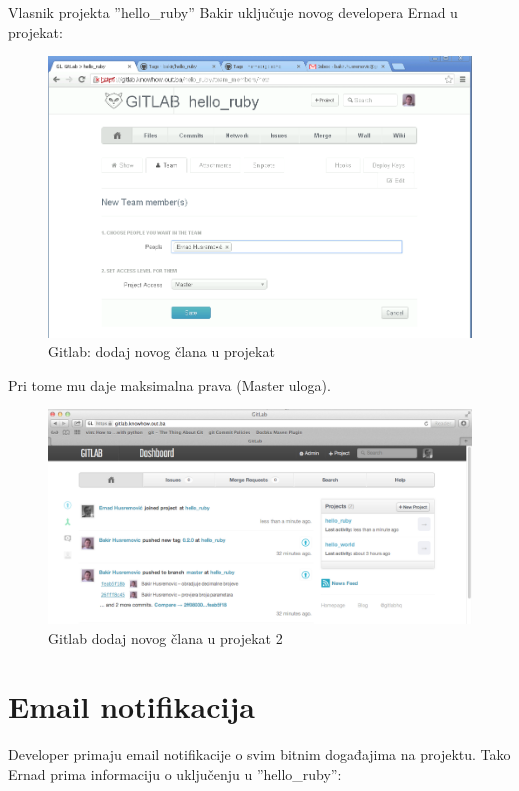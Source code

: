 \documentclass[times, utf8, seminar]{fit}
\begin{document}
Vlasnik projekta ''hello\_ruby'' Bakir uključuje novog developera Ernad u projekat:

\begin{figure}[H]
\centering
\includegraphics[width=15cm]{img/gitlab_add_new_member_to_project.png}
\caption{Gitlab: dodaj novog člana u projekat}
\end{figure}

Pri tome mu daje maksimalna prava (Master uloga).

\begin{figure}[H]
\centering
\includegraphics[width=15cm]{img/gitlab_add_new_member_to_project_2.png}
\caption{Gitlab dodaj novog člana u projekat 2}
\end{figure}

\section{Email notifikacija}

Developer primaju email notifikacije o svim bitnim događajima na projektu. Tako Ernad prima informaciju o uključenju u ''hello\_ruby'':
\end{document}
